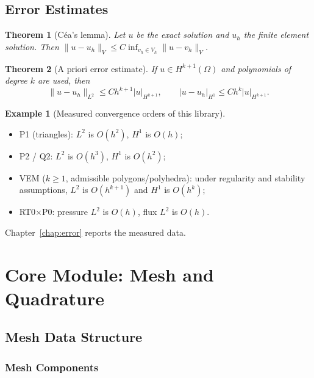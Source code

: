 \documentclass[11pt,oneside]{book}
\theoremstyle{definition}
\newtheorem{example}{Example}[chapter]
\theoremstyle{plain}
\newtheorem{theorem}{Theorem}[chapter]
\begin{document}
\section{Error Estimates}

\begin{theorem}[C\'ea's lemma]
Let $u$ be the exact solution and $u_h$ the finite element solution. Then
$\|u-u_h\|_V\le C\inf_{v_h\in V_h}\|u-v_h\|_V$.
\end{theorem}

\begin{theorem}[A priori error estimate]
If $u\in H^{k+1}(\Omega)$ and polynomials of degree $k$ are used, then
\begin{equation}
\|u-u_h\|_{L^2}\le C h^{k+1}|u|_{H^{k+1}},\qquad
|u-u_h|_{H^1}\le C h^{k}|u|_{H^{k+1}} .
\label{eq:apriori}
\end{equation}
\end{theorem}

\begin{example}[Measured convergence orders of this library]
\begin{itemize}[itemsep=0.15em]
  \item P1 (triangles): $L^2$ is $O(h^2)$, $H^1$ is $O(h)$;
  \item P2 / Q2: $L^2$ is $O(h^3)$, $H^1$ is $O(h^2)$;
  \item VEM ($k\ge1$, admissible polygons/polyhedra): under regularity and stability assumptions, $L^2$ is $O(h^{k+1})$ and $H^1$ is $O(h^k)$;
  \item RT0$\times$P0: pressure $L^2$ is $O(h)$, flux $L^2$ is $O(h)$.
\end{itemize}
Chapter~\ref{chap:error} reports the measured data.
\end{example}

\chapter{Core Module: Mesh and Quadrature}
\label{chap:core}

\section{Mesh Data Structure}

\subsection{Mesh Components}
\end{document}
